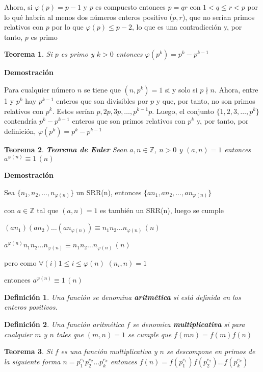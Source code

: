 \documentclass[a4paper,12pt]{report}
\newtheorem*{teo}{Teorema}
\newtheorem*{dfn}{Definición}
\begin{document}
Ahora, si $\varphi(p)=p-1$ y $p$ es compuesto entonces $p=qr$ con $1<q \leq r <p$ por lo qué habría al menos dos números enteros positivo ($p,r$),  que no serían primos relativos con $p$ por lo que $\varphi(p)\leq p-2$, lo que es una contradicción y, por tanto, $p$ es primo

\begin{teo}
 Si $p$ es primo y $k>0$ entonces $\varphi(p^k)=p^k - p^{k-1}$
\end{teo}

\textbf{Demostración}

Para cualquier número $n$ se tiene que $(n,p^k)=1$ si y solo si $p\nmid n$. Ahora, entre 1 y $p^k$ hay $p^{k-1}$ enteros que son divisibles por $p$ y que, por tanto, no son primos relativos con $p^k$. Estos serían $p,2p,3p,\dots,p^{k-1}p$. Luego, el conjunto $\{1,2,3,\dots,p^k\}$ contendría $p^k-p^{k-1}$ enteros que son primos relativos con $p^k$ y, por tanto, por definición, $\varphi(p^k)=p^k - p^{k-1}$


\begin{teo}
 \textbf{Teorema de Euler} Sean $a,n\in\mathbb{Z}$, $n>0$ y $(a,n)=1$ entonces $a^{\varphi(n)}\equiv 1\, (n)$
\end{teo}

\textbf{Demostración}

Sea $\{n_1,n_2,\dots,n_{\varphi(n)}\}$ un SRR(n), entonces $\{an_1,an_2,\dots,an_{\varphi(n)}\}$

con $a\in\mathbb{Z}$ tal que $(a,n)=1$ es también un SRR(n), luego se cumple

$(an_1)(an_2)\dots(an_{\varphi(n)})\equiv n_1 n_2 \dots n_{\varphi(n)} \, (n)$

$a^{\varphi(n)}n_1 n_2\dots n_{\varphi(n)}\equiv n_1 n_2 \dots n_{\varphi(n)} \, (n)$

pero como $\forall(i) 1\leq i\leq \varphi(n)$ $(n_i,n)=1$

entonces $a^{\varphi(n)}\equiv 1\, (n)$

\begin{dfn}
 Una función se denomina \textbf{aritmética} si está definida en los enteros positivos.
\end{dfn}

\begin{dfn}
 Una función aritmética  $f$ se denomica \textbf{multiplicativa} si para cualquier $m$ y $n$ tales que $(m,n)=1$ se cumple que $f(mn)=f(m)f(n)$
\end{dfn}

\begin{teo}
 Si $f$ es una función multiplicativa y $n$ se descompone en primos de la siguiente forma $n=p_1^{e_1}p_2^{e_2}\dots p_k^{e_k}$ entonces $f(n)=f(p_1^{e_1})f(p_2^{e_2})\dots f(p_k^{e_k})$
\end{teo}
\end{document}
